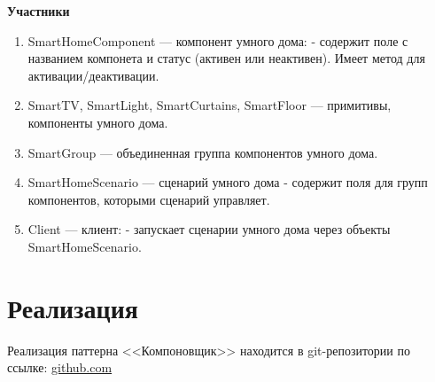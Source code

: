 \documentclass[PI,LAB]{HSEUniversity}
\begin{document}
\textbf{Участники}

\begin{enumerate}
  \item SmartHomeComponent --- компонент умного дома: - содержит поле с названием компонета и статус (активен или неактивен). Имеет метод для активации/деактивации. 
  \item SmartTV, SmartLight, SmartCurtains, SmartFloor --- примитивы, компоненты умного дома. 
  \item SmartGroup --- объединенная группа компонентов умного дома. 
  \item SmartHomeScenario --- сценарий умного дома - содержит поля для групп компонентов, которыми сценарий управляет.
  \item Client --- клиент: - запускает сценарии умного дома через объекты SmartHomeScenario.
\end{enumerate}

\section{Реализация}
Реализация паттерна <<Компоновщик>> находится в git-репозитории по ссылке: \href{https://github.com/rovany706/design-patterns/tree/master/Composite/src/com/Composite}{github.com}
\end{document}
